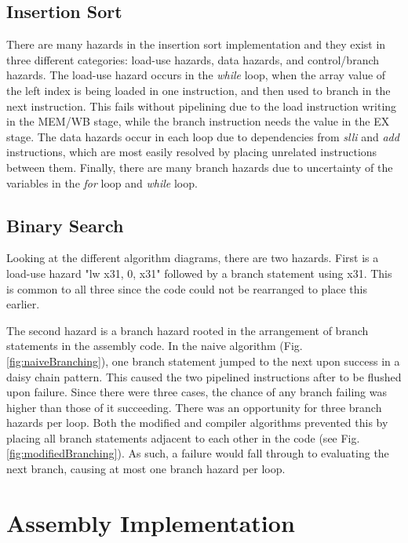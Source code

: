 \documentclass[lettersize,journal]{IEEEtran}
\begin{document}
	\subsection{Insertion Sort}
		There are many hazards in the insertion sort implementation and they exist in three different categories: load-use hazards, data hazards, and control/branch hazards. 
		The load-use hazard occurs in the \textit{while} loop, when the array value of the left index is being loaded in one instruction, and then used to branch in the next instruction. This fails without pipelining due to the load instruction writing in the MEM/WB stage, while the branch instruction needs the value in the EX stage. The data hazards occur in each loop due to dependencies from \textit{slli} and \textit{add} instructions, which are most easily resolved by placing unrelated instructions between them. Finally, there are many branch hazards due to uncertainty of the variables in the \textit{for} loop and \textit{while} loop.
	\subsection{Binary Search}
    Looking at the different algorithm diagrams, there are two hazards. First is a load-use hazard "lw x31, 0, x31" followed by a branch statement using x31. This is common to all three since the code could not be rearranged to place this earlier.

    The second hazard is a branch hazard rooted in the arrangement of branch statements in the assembly code. In the naive algorithm (Fig. \ref{fig:naiveBranching}), one branch statement jumped to the next upon success in a daisy chain pattern. This caused the two pipelined instructions after to be flushed upon failure. Since there were three cases, the chance of any branch failing was higher than those of it succeeding. There was an opportunity for three branch hazards per loop. Both the modified and compiler algorithms prevented this by placing all branch statements adjacent to each other in the code (see Fig. \ref{fig:modifiedBranching}). As such, a failure would fall through to evaluating the next branch, causing at most one branch hazard per loop.
    
\section{Assembly Implementation}
\end{document}
